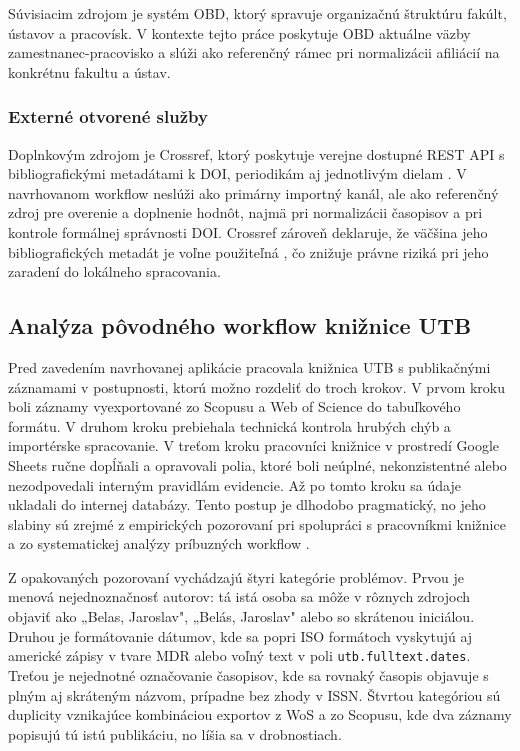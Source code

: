 Súvisiacim zdrojom je systém OBD, ktorý spravuje organizačnú štruktúru fakúlt, ústavov a pracovísk. V kontexte tejto práce poskytuje OBD aktuálne väzby zamestnanec-pracovisko a slúži ako referenčný rámec pri normalizácii afiliácií na konkrétnu fakultu a ústav.

\subsubsection{Externé otvorené služby}

Doplnkovým zdrojom je Crossref, ktorý poskytuje verejne dostupné REST API s bibliografickými metadátami k DOI, periodikám aj jednotlivým dielam \cite{CrossrefRESTAPI}. V navrhovanom workflow neslúži ako primárny importný kanál, ale ako referenčný zdroj pre overenie a doplnenie hodnôt, najmä pri normalizácii časopisov a pri kontrole formálnej správnosti DOI. Crossref zároveň deklaruje, že väčšina jeho bibliografických metadát je voľne použiteľná \cite{CrossrefMetadataRetrieval}, čo znižuje právne riziká pri jeho zaradení do lokálneho spracovania.

\subsection{Analýza pôvodného workflow knižnice UTB}

Pred zavedením navrhovanej aplikácie pracovala knižnica UTB s publikačnými záznamami v postupnosti, ktorú možno rozdeliť do troch krokov. V prvom kroku boli záznamy vyexportované zo Scopusu a Web of Science do tabuľkového formátu. V druhom kroku prebiehala technická kontrola hrubých chýb a importérske spracovanie. V treťom kroku pracovníci knižnice v prostredí Google Sheets ručne dopĺňali a opravovali polia, ktoré boli neúplné, nekonzistentné alebo nezodpovedali interným pravidlám evidencie. Až po tomto kroku sa údaje ukladali do internej databázy. Tento postup je dlhodobo pragmatický, no jeho slabiny sú zrejmé z empirických pozorovaní pri spolupráci s pracovníkmi knižnice a zo systematickej analýzy príbuzných workflow \cite{Mikulecky2025}.

Z opakovaných pozorovaní vychádzajú štyri kategórie problémov. Prvou je menová nejednoznačnosť autorov: tá istá osoba sa môže v rôznych zdrojoch objaviť ako „Belas, Jaroslav", „Belás, Jaroslav" alebo so skrátenou iniciálou. Druhou je formátovanie dátumov, kde sa popri ISO formátoch vyskytujú aj americké zápisy v tvare MDR alebo voľný text v poli \texttt{utb.fulltext.dates}. Treťou je nejednotné označovanie časopisov, kde sa rovnaký časopis objavuje s plným aj skráteným názvom, prípadne bez zhody v ISSN. Štvrtou kategóriou sú duplicity vznikajúce kombináciou exportov z WoS a zo Scopusu, kde dva záznamy popisujú tú istú publikáciu, no líšia sa v drobnostiach.

